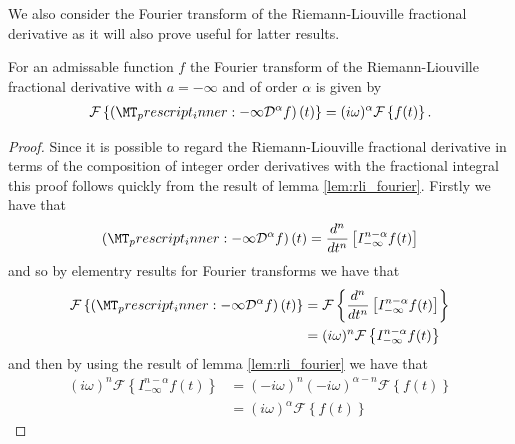 We also consider the Fourier transform of the Riemann-Liouville fractional derivative as it will also prove useful for latter results.
\begin{mdframed}[innertopmargin=10pt]
\begin{lemma}
    \label{lem:rld_fourier}
    For an admissable function $ f $ the Fourier transform of the Riemann-Liouville fractional derivative with $ a = -\infty $ and of order $ \alpha $ is given by
    \begin{align*}
        \mathcal{F}\left\{ \left(\prescript{}{-\infty}{\mathcal{D}}^\alpha f\right)(t) \right\} = (i\omega)^{\alpha} \mathcal{F}\left\{ f(t) \right\}.
    \end{align*}
\end{lemma}
\end{mdframed}
\begin{proof}
    Since it is possible to regard the Riemann-Liouville fractional derivative in terms of the composition of integer order derivatives with the fractional integral this proof follows quickly from the result of lemma \ref{lem:rli_fourier}.
    Firstly we have that
    \begin{align*}
        \left(\prescript{}{-\infty}{\mathcal{D}}^\alpha f\right)(t) = \frac{d^n}{dt^n} \left[ I_{-\infty}^{n - \alpha} f(t)\right]
    \end{align*}
    and so by elementry results for Fourier transforms we have that
    \begin{align*}
        \mathcal{F}\left\{ \left(\prescript{}{-\infty}{\mathcal{D}}^\alpha f\right)(t) \right\}  &=
        \mathcal{F}\left\{ \frac{d^n}{dt^n} \left[ I_{-\infty}^{n-\alpha} f(t) \right] \right\} \\
        &= (i\omega)^{n} \mathcal{F}\left\{ I_{-\infty}^{n-\alpha} f(t) \right\}
    \end{align*}
    and then by using the result of lemma \ref{lem:rli_fourier} we have that
    \begin{align*}
        (i\omega)^{n} \mathcal{F}\left\{ I_{-\infty}^{n-\alpha} f(t) \right\} &= (-i\omega)^{n}(-i\omega)^{\alpha - n}\mathcal{F}\left\{ f(t)\right\} \\
        &= (i\omega)^\alpha  \mathcal{F}\left\{ f(t) \right\}
    \end{align*}
\end{proof}

